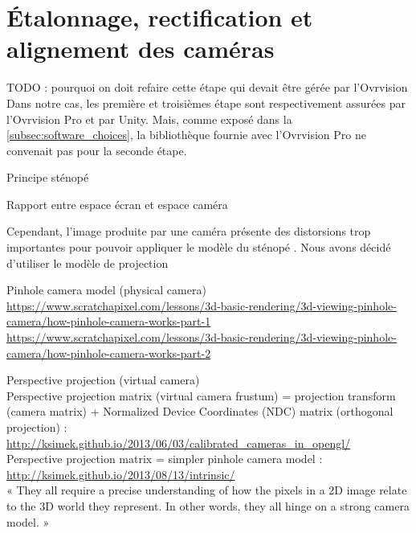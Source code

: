 \section{Étalonnage, rectification et alignement des caméras}
\label{sec:calibration}

TODO : pourquoi on doit refaire cette étape qui devait être gérée par l'Ovrvision
Dans notre cas, les première et troisièmes étape sont respectivement assurées par l'Ovrvision Pro et par Unity. Mais, comme exposé dans la \autoref{subsec:software_choices}, la bibliothèque fournie avec l'Ovrvision Pro ne convenait pas pour la seconde étape.

Principe sténopé

Rapport entre espace écran et espace caméra

Cependant, l'image produite par une caméra  présente des distorsions trop importantes pour pouvoir appliquer le modèle du sténopé . Nous avons décidé d'utiliser le modèle de projection



Pinhole camera model (physical camera)\\
\url{https://www.scratchapixel.com/lessons/3d-basic-rendering/3d-viewing-pinhole-camera/how-pinhole-camera-works-part-1}\\
\url{https://www.scratchapixel.com/lessons/3d-basic-rendering/3d-viewing-pinhole-camera/how-pinhole-camera-works-part-2}

Perspective projection (virtual camera)\\
Perspective projection matrix (virtual camera frustum) = projection transform (camera matrix) + Normalized Device Coordinates (NDC) matrix (orthogonal projection) : \url{http://ksimek.github.io/2013/06/03/calibrated_cameras_in_opengl/}\\
Perspective projection matrix = simpler pinhole camera model : \url{http://ksimek.github.io/2013/08/13/intrinsic/}\\
« They all require a precise understanding of how the pixels in a 2D image relate to the 3D world they represent. In other words, they all hinge on a strong camera model. »

